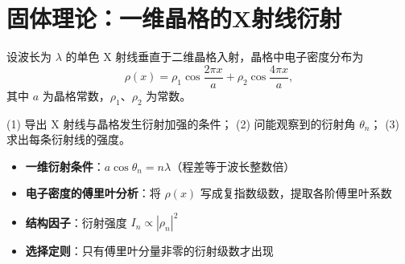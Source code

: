 \section{固体理论：一维晶格的X射线衍射}
\label{sec:1d-lattice-diffraction}

\begin{modelbox}[题目：一维晶格的衍射条件与强度]
设波长为 $\lambda$ 的单色 X 射线垂直于二维晶格入射，晶格中电子密度分布为
\begin{equation}
\rho(x)=\rho_1\cos\frac{2\pi x}{a}+\rho_2\cos\frac{4\pi x}{a},
\end{equation}
其中 $a$ 为晶格常数，$\rho_1$、$\rho_2$ 为常数。

(1) 导出 X 射线与晶格发生衍射加强的条件；
(2) 问能观察到的衍射角 $\theta_n$；
(3) 求出每条衍射线的强度。
\end{modelbox}

\begin{tipbox}[考点快速分析]
\begin{itemize}
    \item \textbf{一维衍射条件}：$a\cos\theta_n=n\lambda$（程差等于波长整数倍）
    \item \textbf{电子密度的傅里叶分析}：将 $\rho(x)$ 写成复指数级数，提取各阶傅里叶系数
    \item \textbf{结构因子}：衍射强度 $I_n\propto|\rho_n|^2$
    \item \textbf{选择定则}：只有傅里叶分量非零的衍射级数才出现
\end{itemize}
\end{tipbox}

